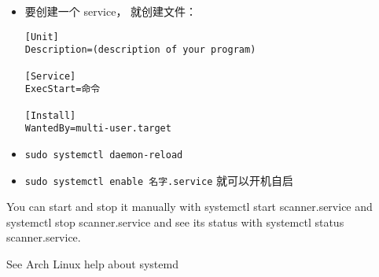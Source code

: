 
\begin{itemize}
\item 要创建一个 service， 就创建文件：
\begin{lstlisting}[language=none,caption=/etc/systemd/system/名字.service]
[Unit]
Description=(description of your program)

[Service]
ExecStart=命令

[Install]
WantedBy=multi-user.target
\end{lstlisting}
\item \verb|sudo systemctl daemon-reload|
\item \verb|sudo systemctl enable 名字.service| 就可以开机自启
\end{itemize}

You can start and stop it manually with systemctl start scanner.service and systemctl stop scanner.service and see its status with systemctl status scanner.service.

See Arch Linux help about systemd